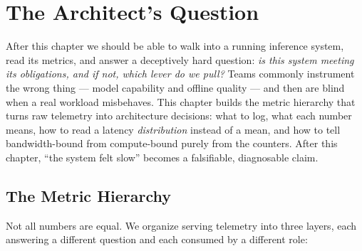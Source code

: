 \section*{The Architect's Question}\label{the-architects-question}

After this chapter we should be able to walk into a running inference
system, read its metrics, and answer a deceptively hard question:
\emph{is this system meeting its obligations, and if not, which lever do
we pull?} Teams commonly instrument the wrong thing --- model capability
and offline quality --- and then are blind when a real workload
misbehaves. This chapter builds the metric hierarchy that turns raw
telemetry into architecture decisions: what to log, what each number
means, how to read a latency \emph{distribution} instead of a mean, and
how to tell bandwidth-bound from compute-bound purely from the counters.
After this chapter, ``the system felt slow'' becomes a falsifiable,
diagnosable claim.

\label{concept}


\subsection{The Metric Hierarchy}\label{the-metric-hierarchy}

Not all numbers are equal. We organize serving telemetry into three
layers, each answering a different question and each consumed by a
different role:


